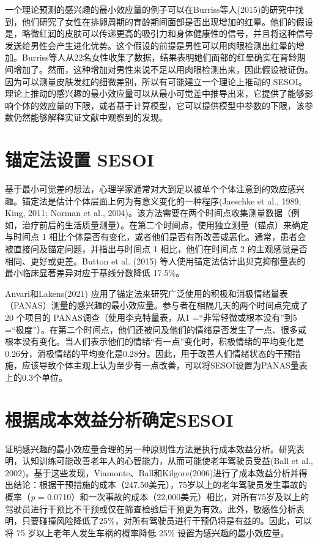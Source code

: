 \documentclass[
  letterpaper,
  DIV=11,
  numbers=noendperiod]{scrreprt}
\begin{document}
一个理论预测的感兴趣的最小效应量的例子可以在Burriss等人(2015)的研究中找到，他们研究了女性在排卵周期的育龄期间面部是否出现增加的红晕。他们的假设是，略微红润的皮肤可以传递更高的吸引力和身体健康性的信号，并且将这种信号发送给男性会产生进化优势。这个假设的前提是男性可以用肉眼检测出红晕的增加。Burriss等人从22名女性收集了数据，结果表明她们面部的红晕确实在育龄期间增加了。然而，这种增加对男性来说不足以用肉眼检测出来，因此假设被证伪。因为可以测量皮肤发红的细微差别，所以有可能建立一个理论上推动的
SESOI。理论上推动的感兴趣的最小效应量可以从最小可觉差中推导出来，它提供了能够影响个体的效应量的下限，或者基于计算模型，它可以提供模型中参数的下限，该参数仍然能够解释实证文献中观察到的发现。

\hypertarget{ux951aux5b9aux6cd5ux8bbeux7f6e-sesoi}{%
\section{锚定法设置 SESOI}\label{ux951aux5b9aux6cd5ux8bbeux7f6e-sesoi}}

基于最小可觉差的想法，心理学家通常对大到足以被单个个体注意到的效应感兴趣。锚定法是估计个体层面上何为有意义变化的一种程序(Jaeschke
et al., 1989; King, 2011; Norman et al.,
2004)。该方法需要在两个时间点收集测量数据（例如，治疗前后的生活质量测量）。在第二个时间点，使用独立测量（锚点）来确定与时间点
1
相比个体是否有变化，或者他们是否有所改善或恶化。通常，患者会被直接问及锚定问题，并指出与时间点
1 相比，他们在时间点 2 的主观感觉是否相同、更好或更差。Button et al.
(2015)
等人使用锚定法估计出贝克抑郁量表的最小临床显著差异对应于基线分数降低
17.5\%。

Anvari和Lakens(2021)
应用了锚定法来研究广泛使用的积极和消极情绪量表（PANAS）测量的感兴趣的最小效应量。参与者在相隔几天的两个时间点完成了
20 个项目的 PANAS调查（使用李克特量表，从1 =``非常轻微或根本没有''到5
=``极度''）。在第二个时间点，他们还被问及他们的情绪是否发生了一点、很多或根本没有变化。当人们表示他们的情绪``有一点''变化时，积极情绪的平均变化是0.26分，消极情绪的平均变化是0.28分。因此，用于改善人们情绪状态的干预措施，应该导致个体主观上认为至少有一点改善，可以将SESOI设置为PANAS量表上的0.3个单位。

\hypertarget{ux6839ux636eux6210ux672cux6548ux76caux5206ux6790ux786eux5b9asesoi}{%
\section{根据成本效益分析确定SESOI}\label{ux6839ux636eux6210ux672cux6548ux76caux5206ux6790ux786eux5b9asesoi}}

证明感兴趣的最小效应量合理的另一种原则性方法是执行成本效益分析。研究表明，认知训练可能改善老年人的心智能力，从而可能使老年驾驶员受益(Ball
et al.,
2002)。基于这些发现，Viamonte、Ball和Kilgore(2006)进行了成本效益分析并得出结论：根据干预措施的成本（247.50美元），75岁以上的老年驾驶员发生事故的概率（\emph{p}
=
0.0710）和一次事故的成本（22,000美元）相比，对所有75岁及以上的驾驶员进行干预比不干预或仅在筛查检验后干预更为有效。此外，敏感性分析表明，只要碰撞风险降低了25\%，对所有驾驶员进行干预仍将是有益的。因此，可以将
75 岁以上老年人发生车祸的概率降低 25\% 设置为感兴趣的最小效应量。
\end{document}
